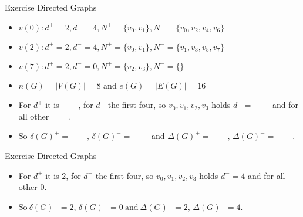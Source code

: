 \begin{frame}[allowframebreaks]{Exercise \thesection}{Directed Graphs}
\begin{solutionnoinc}
  \end{solutionnoinc}
  \begin{solution}
    \begin{itemize}
      \item $v(0): d^{+}=2,d^{-}=4,N^{+}=\{v_{0},v_{1}\},N^{-}=\{v_{0},v_{2},v_{4},v_{6}\}$
      \item $v(2): d^{+}=2,d^{-}=4,N^{+}=\{v_{0},v_{1}\},N^{-}=\{v_{1},v_{3},v_{5},v_{7}\}$
      \item $v(7): d^{+}=2,d^{-}=0,N^{+}=\{v_{2},v_{3}\},N^{-}=\{\}$
      \item $n(G)=|V(G)|=8$ and $e(G)=|E(G)|=16$
    \end{itemize}
  \end{solution}
  \begin{solutionnoinc}
    \begin{itemize}
      \item For $d^+$ it is $\qquad$, for $d^-$ the first four, so $v_0, v_1, v_2, v_3$ holds $d^- = \qquad$ and for all other $\qquad$.
      \item So $\delta(G)^{+}=\qquad, \,\delta(G)^{-}=\qquad$ and $\Delta(G)^{+}=\qquad,\,\Delta(G)^{-}=\qquad.$
    \end{itemize}
  \end{solutionnoinc}
\end{frame}
\begin{frame}[allowframebreaks]{Exercise \thesection}{Directed Graphs}
  \begin{solution}
    \begin{itemize}
      \item For $d^+$ it is $2$, for $d^-$ the first four, so $v_0, v_1, v_2, v_3$ holds $d^- = 4$ and for all other $0$.
      \item $\mathrm{So~}\delta(G)^{+}=2, \,\delta(G)^{-}=0\mathrm{~and~}\Delta(G)^{+}=2,\,\Delta(G)^{-}=4.$
    \end{itemize}
  \end{solution}
\end{frame}
